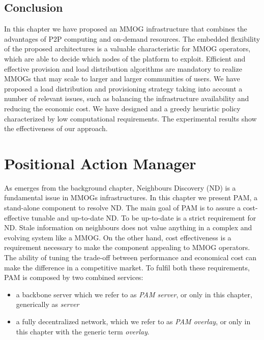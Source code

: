\documentclass[final,10pt,a5paper]{phdimt}
\theoremstyle{definition}
\begin{document}
\section{Conclusion}
\label{sec:conclusion}

In this chapter we have proposed an MMOG infrastructure that combines the advantages of P2P computing and on-demand resources.
The embedded flexibility of the proposed architectures is a valuable
characteristic for MMOG operators, which are able to decide which
nodes of the platform to exploit. 
Efficient and effective provision and load distribution algorithms are mandatory to realize MMOGs that may scale
to larger and larger communities of users. 
We have proposed a load distribution and provisioning strategy taking into account a number of relevant issues, such as balancing the infrastructure availability and reducing the economic cost. 
We have designed and a greedy heuristic policy characterized by low computational requirements. 
The experimental results show the effectiveness of our approach.












\clearpage{}
\clearpage{}

\chapter{Positional Action Manager}
\label{chap:pam}

As emerges from the background chapter, Neighbours Discovery (ND) is a fundamental issue in MMOGs infrastructures.
In this chapter we present PAM, a stand-alone component to resolve ND.
The main goal of PAM is to assure a cost-effective tunable and up-to-date ND.
To be up-to-date is a strict requirement for ND.
Stale information on neighbours does not value anything in a complex and evolving system like a MMOG. 
On the other hand, cost effectiveness is a requirement necessary to make the component appealing to MMOG operators.
The ability of tuning the trade-off between performance and economical cost can make the difference in a competitive market.
To fulfil both these requirements, PAM is composed by two combined services:
\begin{itemize}
\item a backbone server which we refer to as \textit{PAM server}, or only in this chapter, generically as \textit{server}
\item a fully decentralized network, which we refer to as \textit{PAM overlay}, or only in this chapter with the generic term \textit{overlay}.
\end{itemize}
\end{document}
